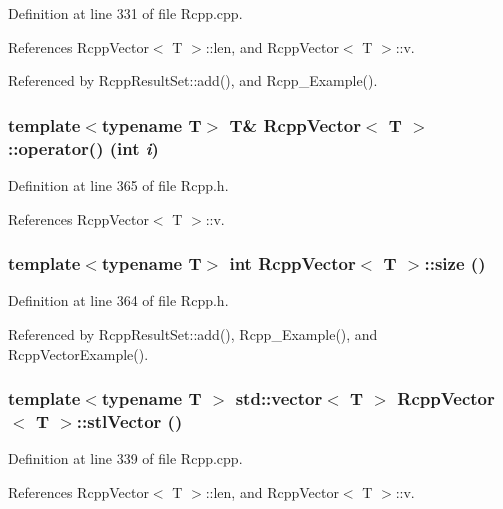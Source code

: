 Definition at line 331 of file Rcpp.cpp.

References RcppVector$<$ T $>$::len, and RcppVector$<$ T $>$::v.

Referenced by RcppResultSet::add(), and Rcpp\_\-Example().\hypertarget{classRcppVector_a66aca1da0563af28e55768d98488a42d}{
\subsubsection[{operator()}]{\setlength{\rightskip}{0pt plus 5cm}template$<$typename T$>$ T\& {\bf RcppVector}$<$ T $>$::operator() (int {\em i})}}
\label{classRcppVector_a66aca1da0563af28e55768d98488a42d}


Definition at line 365 of file Rcpp.h.

References RcppVector$<$ T $>$::v.\hypertarget{classRcppVector_a1e2424dc9b91014ba8b2c9351d97eb37}{
\subsubsection[{size}]{\setlength{\rightskip}{0pt plus 5cm}template$<$typename T$>$ int {\bf RcppVector}$<$ T $>$::size ()}}
\label{classRcppVector_a1e2424dc9b91014ba8b2c9351d97eb37}


Definition at line 364 of file Rcpp.h.

Referenced by RcppResultSet::add(), Rcpp\_\-Example(), and RcppVectorExample().\hypertarget{classRcppVector_ac650f89b966962b167f3bc42aecf213b}{
\subsubsection[{stlVector}]{\setlength{\rightskip}{0pt plus 5cm}template$<$typename T $>$ std::vector$<$ T $>$ {\bf RcppVector}$<$ T $>$::stlVector ()}}
\label{classRcppVector_ac650f89b966962b167f3bc42aecf213b}


Definition at line 339 of file Rcpp.cpp.

References RcppVector$<$ T $>$::len, and RcppVector$<$ T $>$::v.

